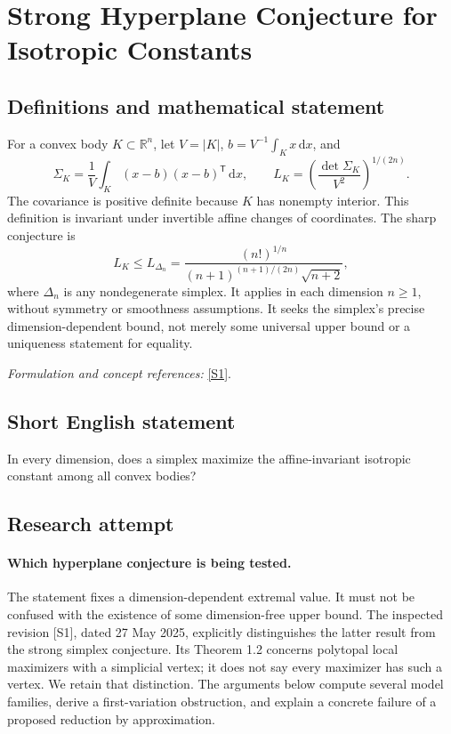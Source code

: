 \documentclass[11pt]{article}
\begin{document}
\section*{\texorpdfstring{Strong Hyperplane Conjecture for Isotropic Constants}{Strong Hyperplane Conjecture for Isotropic Constants}}\label{358}
\subsection{Definitions and mathematical statement}
For a convex body $K\subset{\mathbb{R}}^n$, let $V=|K|$, $b=V^{-1}\int_Kx{\,\mathrm{d}} x$, and
\[
 \Sigma_K=\frac1V\int_K(x-b)(x-b)^{\mathsf T}{\,\mathrm{d}} x,
 \qquad L_K=\left(\frac{\det\Sigma_K}{V^2}\right)^{1/(2n)}.
\]
The covariance is positive definite because $K$ has nonempty interior. This definition is invariant under invertible affine changes of coordinates. The sharp conjecture is
\[
 L_K\le L_{\Delta_n}
 =\frac{(n!)^{1/n}}{(n+1)^{(n+1)/(2n)}\sqrt{n+2}},
\]
where $\Delta_n$ is any nondegenerate simplex. It applies in each dimension $n\ge1$, without symmetry or smoothness assumptions. It seeks the simplex's precise dimension-dependent bound, not merely some universal upper bound or a uniqueness statement for equality.
\par\smallskip\textit{Formulation and concept references:} \href{https://arxiv.org/pdf/2407.01353v2}{[S1]}.

\subsection{Short English statement}
In every dimension, does a simplex maximize the affine-invariant isotropic constant among all convex bodies?
\subsection{Research attempt}
\paragraph{Which hyperplane conjecture is being tested.}
The statement fixes a dimension-dependent extremal value. It must
not be confused with the existence of some dimension-free upper
bound. The inspected revision [S1], dated 27 May 2025, explicitly
distinguishes the latter result from the strong simplex conjecture.
Its Theorem 1.2 concerns polytopal local maximizers with a simplicial
vertex; it does not say every maximizer has such a vertex. We retain
that distinction. The arguments below compute several model families,
derive a first-variation obstruction, and explain a concrete failure
of a proposed reduction by approximation.
\end{document}
